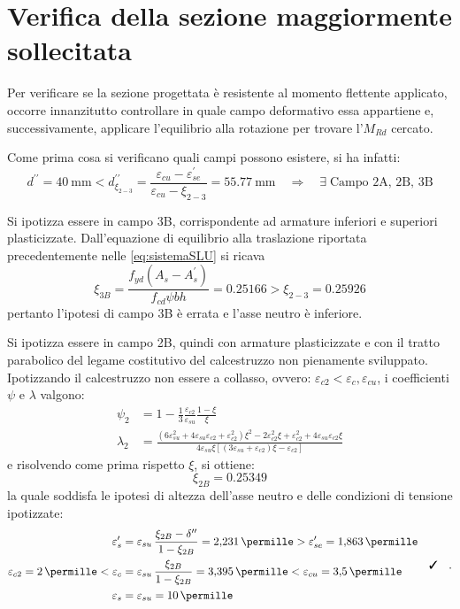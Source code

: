 \section{Verifica della sezione maggiormente sollecitata}
Per verificare se la sezione progettata è resistente al momento flettente applicato, occorre innanzitutto controllare in quale campo deformativo essa appartiene e, successivamente, applicare l'equilibrio alla rotazione per trovare l'$M_{Rd}$ cercato.

Come prima cosa si verificano quali campi possono esistere, si ha infatti:
\begin{equation}
  d^{\prime\prime} = \SI{40}{\milli\metre} <  d^{\prime\prime}_{\xi_{2-3}} = \frac{\varepsilon_{cu} - \varepsilon_{se}^\prime}{\varepsilon_{cu} - \xi_{2-3}} =\SI{55.77}{\milli\metre} \quad \Longrightarrow  \quad \exists \; \text{Campo 2A, 2B, 3B}
\end{equation}

Si ipotizza essere in campo 3B, corrispondente ad armature inferiori e superiori plasticizzate.
Dall'equazione di equilibrio alla traslazione riportata precedentemente nelle \ref{eq:sistemaSLU} si ricava
\[
  \xi_{3B} = \frac{f_{yd} (A_s - A_s^\prime)}{f_{cd} \psi b h} = \num{0.25166} > \xi_{2-3} = \num{0.25926}
\]
pertanto l'ipotesi di campo 3B è errata e l'asse neutro è inferiore.

Si ipotizza essere in campo 2B, quindi con armature plasticizzate e con il tratto parabolico del legame costitutivo del calcestruzzo non pienamente sviluppato.
Ipotizzando il calcestruzzo non essere a collasso, ovvero: $\varepsilon_{c2} < \varepsilon_{c} , \varepsilon_{cu}$, i coefficienti $\psi$ e $\lambda$ valgono:
\[
  \begin{split}
    \psi_{2} &= 1 - \frac{1}{3}   \frac{\varepsilon_{c2}}{\varepsilon_{su}}\frac{1-\xi}{\xi}\\
    \lambda_{2} &= \frac{\left( 6\varepsilon_{su}^2 + 4\varepsilon_{su}\varepsilon_{c2} + \varepsilon_{c2}^2 \right)\xi^2 -2\varepsilon_{c2}^2 \xi + \varepsilon_{c2}^2 + 4\varepsilon_{su}\varepsilon_{c2}\xi}{4\varepsilon_{su}\xi \left[ \left( 3\varepsilon_{su} + \varepsilon_{c2} \right)\xi - \varepsilon_{c2} \right]}
  \end{split}  
\]
e risolvendo come prima rispetto $\xi$, si ottiene:
\begin{equation}
  \xi_{2B} = \num{0.25349}
\end{equation}
la quale soddisfa le ipotesi di altezza dell'asse neutro e delle condizioni di tensione ipotizzate:
\begin{equation}
  \begin{split}
    \varepsilon_{s}^\prime &= \varepsilon_{su}\,\frac{\xi_{2B} - \delta^{\prime\prime}}{1-\xi_{2B}} = \SI{2.231}{\permille} > \varepsilon_{se}^\prime = \SI{1.863}{\permille}\\
    \varepsilon_{c2} = \SI{2}{\permille} < \varepsilon_{c} &= \varepsilon_{su} \,\frac{\xi_{2B}}{1-\xi_{2B}} =  \SI{3.395}{\permille} < \varepsilon_{cu} = \SI{3.5}{\permille}\\
    \varepsilon_{s} &= \varepsilon_{su} = \SI{10}{\permille}
  \end{split}
  \quad \checked \quad .
\end{equation}

